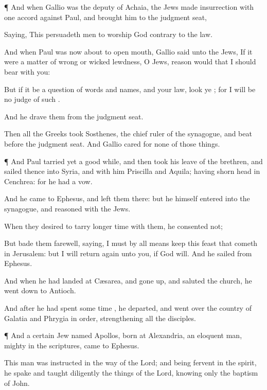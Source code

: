 {\par }{\PP {}¶
And when
Gallio was the
deputy of
Achaia, the
Jews made
insurrection with one
accord against
Paul,
and
brought
him
to the judgment
seat,

Saying,
This
{}
persuadeth
men to
worship
God contrary
to the
law.

And when
Paul was now
about to
open
{}
mouth,
Gallio
said
unto the
Jews,
If it
were a
matter of
wrong
or
wicked
lewdness,
O
{}
Jews,
reason would
that I should
bear with
you:

But
if it
be a
question
of
words
and
names,
and
{}
your
law, look
ye
{};
for
I
will
be
no
judge of
such
{}.

And he
drave
them
from the judgment
seat.

Then
all the
Greeks
took
Sosthenes, the chief ruler of the
synagogue, and
beat
{}
before the judgment
seat.
And
Gallio cared
for
none of those
things.


\par }{\PP {}¶
And
Paul
{}
tarried
{}
yet a
good
while, and then took his
leave of the
brethren, and sailed
thence
into
Syria,
and
with
him
Priscilla
and
Aquila; having
shorn
{}
head
in
Cenchrea:
for he
had a
vow.

And he
came
to
Ephesus,
and left
them
there:
but
he
himself
entered
into the
synagogue, and
reasoned with the
Jews.

When
they
desired
{}
to
tarry
longer
time
with
them, he
consented
not;

But
bade
them
farewell,
saying,
I
must by all
means
keep this
feast that
cometh
in
Jerusalem:
but I will
return
again
unto
you,
if
God
will.
And he
sailed
from
Ephesus.

And when he had
landed
at
Cæsarea, and gone
up,
and
saluted the
church, he went
down
to
Antioch.

And after he had
spent
some
time
{}, he
departed, and went
over
{} the
country of
Galatia
and
Phrygia in
order,
strengthening
all the
disciples.


\par }{\PP {}¶
And a
certain
Jew
named
Apollos,
born at
Alexandria, an
eloquent
man,
{}
mighty
in the
scriptures,
came
to
Ephesus.

This
man
was
instructed in the
way of the
Lord;
and being
fervent in the
spirit, he
spake
and
taught
diligently the
things
of the
Lord,
knowing
only the
baptism of
John.

}
